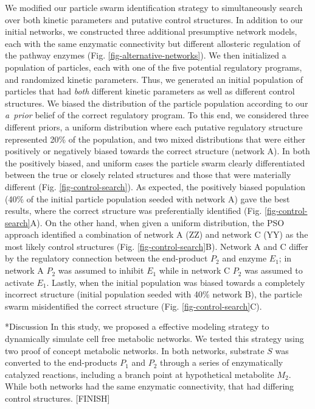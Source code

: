 \documentclass[12pt]{article}
\makeatletter
\renewcommand\section{\@startsection
	{subsection}{2}{0mm}
	{-0.2in}
	{0.05\baselineskip}
	{\normalfont\large\bfseries}}
\makeatother
\begin{document}
We modified our particle swarm identification strategy to simultaneously search over both kinetic parameters and putative control structures.
In addition to our initial networks, we constructed three additional presumptive network models, each with the same enzymatic connectivity but different allosteric 
regulation of the pathway enzymes (Fig. \ref{fig-alternative-networks}). 
We then initialized a population of particles, each with one of the five potential regulatory programs, and randomized kinetic parameters.
Thus, we generated an initial population of particles that had \textit{both} different kinetic parameters as well as different control structures. 
We biased the distribution of the particle population according to our \textit{a~prior} belief of the correct regulatory program.
To this end, we considered three different priors, a uniform distribution where each putative regulatory structure represented 20\% of the population, and
two mixed distributions that were either positively or negatively biased towards the correct structure (network A).
In both the positively biased, and uniform cases the particle swarm clearly differentiated between the true or closely related structures and those that were materially different (Fig. \ref{fig-control-search}).  As expected, the positively biased population (40\% of the initial particle population seeded with network A) gave the best results, where the correct structure was preferentially identified (Fig. \ref{fig-control-search}A). 
On the other hand, when given a uniform distribution, 
the PSO approach identified a combination of network A (ZZ) and network C (YY) as the most likely control structures (Fig. \ref{fig-control-search}B).
Network A and C differ by the regulatory connection between the end-product $P_2$ and enzyme $E_{1}$; in network A $P_{2}$ was assumed to inhibit $E_{1}$ while in network C $P_{2}$ was assumed to activate $E_{1}$.  Lastly, when the initial population was biased towards a completely incorrect structure (initial population seeded with 40\% network B), 
the particle swarm misidentified the correct structure (Fig. \ref{fig-control-search}C). 


\clearpage

\section*{Discussion}
In this study, we proposed a effective modeling strategy to dynamically simulate cell free metabolic networks. 
We tested this strategy using two proof of concept metabolic networks.
In both networks, substrate $S$ was converted to the end-products $P_{1}$ and $P_{2}$ through a series of enzymatically catalyzed reactions, 
including a branch point at hypothetical metabolite $M_{2}$. While both networks had the same enzymatic connectivity, that had differing control structures.
[FINISH]
\end{document}
